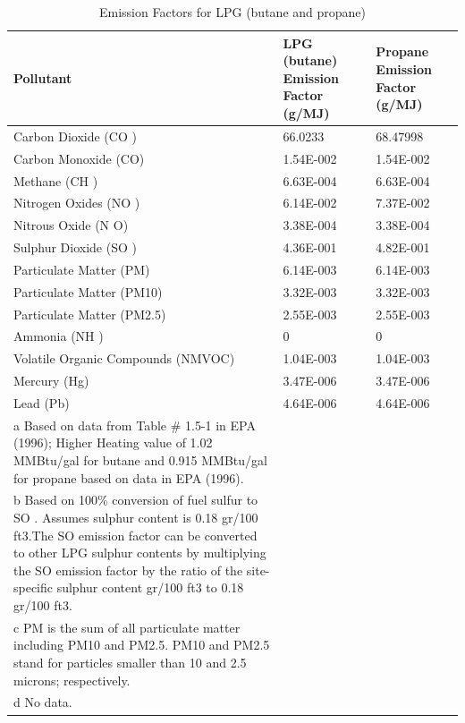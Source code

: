 \begin{longtable}[c]{p{3.0in}p{1.5in}p{1.5in}}
\caption{  Emission Factors for LPG (butane and propane) \protect \label{table:emission-factors-for-lpg-butane-and-propane}}\\
\toprule 
Pollutant & LPG (butane) Emission Factor    (g/MJ) & Propane Emission Factor    (g/MJ) \tabularnewline \midrule
\endhead
Carbon Dioxide (CO  ) & 66.0233 & 68.47998 \tabularnewline
Carbon Monoxide (CO) & 1.54E-002 & 1.54E-002 \tabularnewline
Methane (CH  ) & 6.63E-004 & 6.63E-004 \tabularnewline
Nitrogen Oxides (NO  ) & 6.14E-002 & 7.37E-002 \tabularnewline
Nitrous Oxide (N  O) & 3.38E-004 & 3.38E-004 \tabularnewline
Sulphur Dioxide (SO  ) & 4.36E-001 & 4.82E-001 \tabularnewline
Particulate Matter (PM) & 6.14E-003 & 6.14E-003 \tabularnewline
Particulate Matter (PM10) & 3.32E-003 & 3.32E-003 \tabularnewline
Particulate Matter (PM2.5) & 2.55E-003 & 2.55E-003 \tabularnewline
Ammonia (NH  ) & 0 & 0 \tabularnewline
Volatile Organic Compounds (NMVOC) & 1.04E-003 & 1.04E-003 \tabularnewline
Mercury (Hg) & 3.47E-006 & 3.47E-006 \tabularnewline
Lead (Pb) & 4.64E-006 & 4.64E-006 \tabularnewline
a Based on data from Table \# 1.5-1 in EPA (1996); Higher Heating value of 1.02 MMBtu/gal for butane and 0.915 MMBtu/gal for propane based on data in EPA (1996). \tabularnewline
b Based on 100\% conversion of fuel sulfur to SO  . Assumes sulphur content is 0.18 gr/100 ft3.The SO   emission factor can be converted to other LPG sulphur contents by multiplying the SO   emission factor by the ratio of the site-specific sulphur content gr/100 ft3 to 0.18 gr/100 ft3. \tabularnewline
c PM is the sum of all particulate matter including PM10 and PM2.5. PM10 and PM2.5 stand for particles smaller than 10 and 2.5 microns; respectively. \tabularnewline
d No data. \tabularnewline
\bottomrule
\end{longtable}

